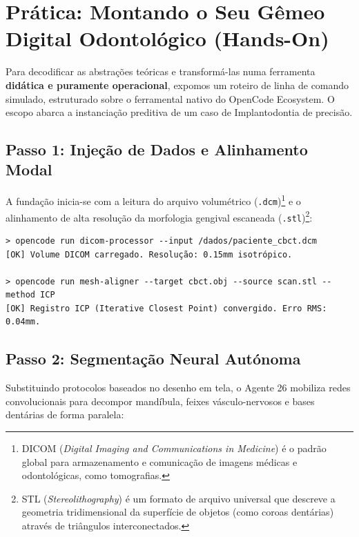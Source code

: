 \section{Prática: Montando o Seu Gêmeo Digital Odontológico (Hands-On)}
\label{sec:hands-on}

Para decodificar as abstrações teóricas e transformá-las numa ferramenta \textbf{didática e puramente operacional}, expomos um roteiro de linha de comando simulado, estruturado sobre o ferramental nativo do OpenCode Ecosystem. O escopo abarca a instanciação preditiva de um caso de Implantodontia de precisão.


\subsection*{Passo 1: Injeção de Dados e Alinhamento Modal}
A fundação inicia-se com a leitura do arquivo volumétrico (\texttt{.dcm})\footnote{DICOM (\textit{Digital Imaging and Communications in Medicine}) é o padrão global para armazenamento e comunicação de imagens médicas e odontológicas, como tomografias.} e o alinhamento de alta resolução da morfologia gengival escaneada (\texttt{.stl})\footnote{STL (\textit{Stereolithography}) é um formato de arquivo universal que descreve a geometria tridimensional da superfície de objetos (como coroas dentárias) através de triângulos interconectados.}:

\begin{lstlisting}[style=bashstyle]
> opencode run dicom-processor --input /dados/paciente_cbct.dcm
[OK] Volume DICOM carregado. Resolução: 0.15mm isotrópico.

> opencode run mesh-aligner --target cbct.obj --source scan.stl --method ICP
[OK] Registro ICP (Iterative Closest Point) convergido. Erro RMS: 0.04mm.
\end{lstlisting}

\subsection*{Passo 2: Segmentação Neural Autónoma}
Substituindo protocolos baseados no desenho em tela, o Agente 26 mobiliza redes convolucionais para decompor mandíbula, feixes vásculo-nervosos e bases dentárias de forma paralela:

